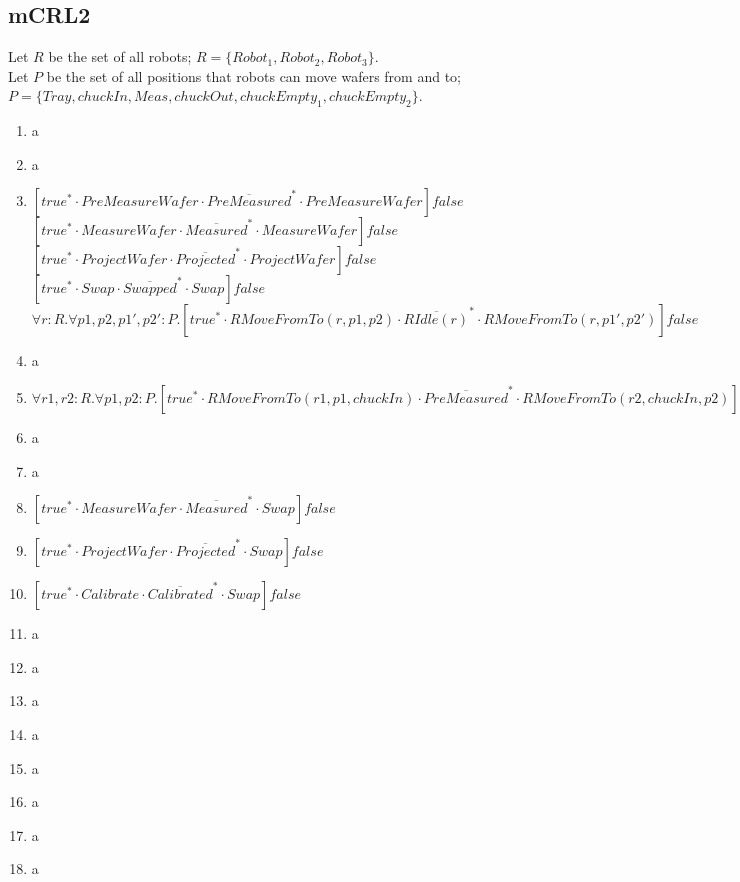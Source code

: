 \subsection{mCRL2}
Let $R$ be the set of all robots; $R = \{Robot_1, Robot_2, Robot_3\}$.\\
Let $P$ be the set of all positions that robots can move wafers from and to; $P = \{Tray, chuckIn, Meas, chuckOut, chuckEmpty_1, chuckEmpty_2\}$.
\begin{enumerate}
    \item a
    \item a
    \item 
	    $[true^{*}\cdot PreMeasureWafer \cdot \overline{PreMeasured}^{*} \cdot PreMeasureWafer]false$\\
	    $[true^{*}\cdot MeasureWafer \cdot \overline{Measured}^{*} \cdot MeasureWafer]false$\\
	    $[true^{*}\cdot ProjectWafer \cdot \overline{Projected}^{*} \cdot ProjectWafer]false$\\
	    $[true^{*}\cdot Swap \cdot \overline{Swapped}^{*} \cdot Swap]false$\\
	    $\forall r:R.\forall p1,p2,p1',p2':P.[true^{*}\cdot RMoveFromTo(r, p1, p2) \cdot \overline{RIdle(r)}^{*} \cdot RMoveFromTo(r, p1', p2')]false$\\
    \item a
    \item $\forall r1,r2:R.\forall p1,p2:P.[true^{*}\cdot RMoveFromTo(r1, p1, chuckIn) \cdot \overline{PreMeasured}^{*} \cdot RMoveFromTo(r2, chuckIn, p2)]false$
    \item a
    \item a
    \item $[true^{*}\cdot MeasureWafer\cdot \overline{Measured}^{*}\cdot Swap]false$
    \item $[true^{*}\cdot ProjectWafer\cdot \overline{Projected}^{*}\cdot Swap]false$
    \item $[true^{*}\cdot Calibrate\cdot \overline{Calibrated}^{*}\cdot Swap]false$
    \item a
    \item a
    \item a
    \item a
    \item a
    \item a
    \item a
    \item a
\end{enumerate}